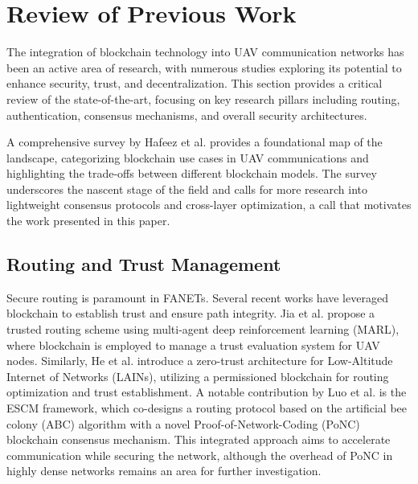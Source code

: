 \section{Review of Previous Work}
\label{sec:literature_review}

The integration of blockchain technology into UAV communication networks has been an active area of research, with numerous studies exploring its potential to enhance security, trust, and decentralization. This section provides a critical review of the state-of-the-art, focusing on key research pillars including routing, authentication, consensus mechanisms, and overall security architectures.

A comprehensive survey by Hafeez et al. \cite{hafeez2023blockchain} provides a foundational map of the landscape, categorizing blockchain use cases in UAV communications and highlighting the trade-offs between different blockchain models. The survey underscores the nascent stage of the field and calls for more research into lightweight consensus protocols and cross-layer optimization, a call that motivates the work presented in this paper.

\subsection{Routing and Trust Management}
Secure routing is paramount in FANETs. Several recent works have leveraged blockchain to establish trust and ensure path integrity. Jia et al. \cite{jia2025trusted} propose a trusted routing scheme using multi-agent deep reinforcement learning (MARL), where blockchain is employed to manage a trust evaluation system for UAV nodes. Similarly, He et al. \cite{he2025trusted} introduce a zero-trust architecture for Low-Altitude Internet of Networks (LAINs), utilizing a permissioned blockchain for routing optimization and trust establishment. A notable contribution by Luo et al. \cite{luo2023escm} is the ESCM framework, which co-designs a routing protocol based on the artificial bee colony (ABC) algorithm with a novel Proof-of-Network-Coding (PoNC) blockchain consensus mechanism. This integrated approach aims to accelerate communication while securing the network, although the overhead of PoNC in highly dense networks remains an area for further investigation.

